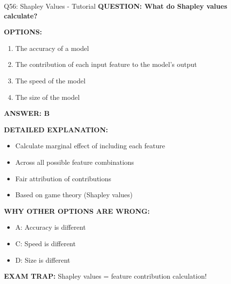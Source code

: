 \documentclass[8pt]{beamer}
\begin{document}
	\begin{frame}{Q56: Shapley Values - Tutorial}
		\fontsize{6.5}{7.5}\selectfont
		\textbf{QUESTION: What do Shapley values calculate?}
		
		\vspace{0.1cm}
		\textbf{OPTIONS:}
		\begin{enumerate}
			\item The accuracy of a model
			\item The contribution of each input feature to the model's output
			\item The speed of the model
			\item The size of the model
		\end{enumerate}
		
		\vspace{0.1cm}
		\textcolor{myblue}{\textbf{ANSWER: B}}
		
		\vspace{0.1cm}
		\textbf{DETAILED EXPLANATION:}
		\begin{itemize}
			\item Calculate marginal effect of including each feature
			\item Across all possible feature combinations
			\item Fair attribution of contributions
			\item Based on game theory (Shapley values)
		\end{itemize}
		
		\vspace{0.1cm}
		\textcolor{myred}{\textbf{WHY OTHER OPTIONS ARE WRONG:}}
		\begin{itemize}
			\item \textcolor{myred}{A:} Accuracy is different
			\item \textcolor{myred}{C:} Speed is different
			\item \textcolor{myred}{D:} Size is different
		\end{itemize}
		
		\textcolor{myred}{\textbf{EXAM TRAP:}} Shapley values = \textcolor{myblue}{feature contribution calculation}!
	\end{frame}
	
\end{document}

